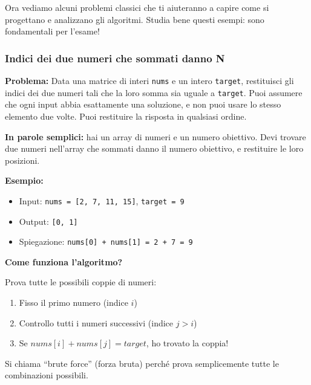 \begin{softnote}
	Ora vediamo alcuni problemi classici che ti aiuteranno a capire come si progettano e analizzano gli algoritmi. Studia bene questi esempi: sono fondamentali per l'esame!
\end{softnote}

\subsubsection*{Indici dei due numeri che sommati danno N}
\textbf{Problema:} Data una matrice di interi \texttt{nums} e un intero \texttt{target}, restituisci gli indici dei due numeri tali che la loro somma sia uguale a \texttt{target}. Puoi assumere che ogni input abbia esattamente una soluzione, e non puoi usare lo stesso elemento due volte. Puoi restituire la risposta in qualsiasi ordine.

\begin{nota}
	\textbf{In parole semplici:} hai un array di numeri e un numero obiettivo. Devi trovare due numeri nell'array che sommati danno il numero obiettivo, e restituire le loro posizioni.
	
	\textbf{Esempio:}
	\begin{itemize}
		\item Input: \texttt{nums = [2, 7, 11, 15]}, \texttt{target = 9}
		\item Output: \texttt{[0, 1]}
		\item Spiegazione: \texttt{nums[0] + nums[1] = 2 + 7 = 9}
	\end{itemize}
\end{nota}

\begin{algorithm}[H]
	\caption{twoSum (Brute Force)}
\end{algorithm}

\begin{softnote}
	\textbf{Come funziona l'algoritmo?}
	
	Prova tutte le possibili coppie di numeri:
	\begin{enumerate}
		\item Fisso il primo numero (indice $i$)
		\item Controllo tutti i numeri successivi (indice $j > i$)
		\item Se $nums[i] + nums[j] = target$, ho trovato la coppia!
	\end{enumerate}
	
	Si chiama ``brute force'' (forza bruta) perché prova semplicemente tutte le combinazioni possibili.
\end{softnote}

